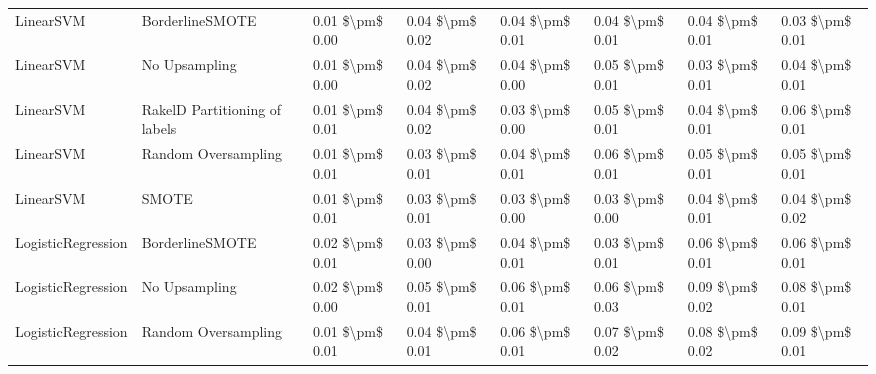 \begin{tabular}{llllllll}
                      LinearSVM &               BorderlineSMOTE & 0.01 \$\textbackslash pm\$ 0.00 &           0.04 \$\textbackslash pm\$ 0.02 &       0.04 \$\textbackslash pm\$ 0.01 &        0.04 \$\textbackslash pm\$ 0.01 &                         0.04 \$\textbackslash pm\$ 0.01 &     0.03 \$\textbackslash pm\$ 0.01 \\
                      LinearSVM &                 No Upsampling & 0.01 \$\textbackslash pm\$ 0.00 &           0.04 \$\textbackslash pm\$ 0.02 &       0.04 \$\textbackslash pm\$ 0.00 &        0.05 \$\textbackslash pm\$ 0.01 &                         0.03 \$\textbackslash pm\$ 0.01 &     0.04 \$\textbackslash pm\$ 0.01 \\
                      LinearSVM & RakelD Partitioning of labels & 0.01 \$\textbackslash pm\$ 0.01 &           0.04 \$\textbackslash pm\$ 0.02 &       0.03 \$\textbackslash pm\$ 0.00 &        0.05 \$\textbackslash pm\$ 0.01 &                         0.04 \$\textbackslash pm\$ 0.01 &     0.06 \$\textbackslash pm\$ 0.01 \\
                      LinearSVM &           Random Oversampling & 0.01 \$\textbackslash pm\$ 0.01 &           0.03 \$\textbackslash pm\$ 0.01 &       0.04 \$\textbackslash pm\$ 0.01 &        0.06 \$\textbackslash pm\$ 0.01 &                         0.05 \$\textbackslash pm\$ 0.01 &     0.05 \$\textbackslash pm\$ 0.01 \\
                      LinearSVM &                         SMOTE & 0.01 \$\textbackslash pm\$ 0.01 &           0.03 \$\textbackslash pm\$ 0.01 &       0.03 \$\textbackslash pm\$ 0.00 &        0.03 \$\textbackslash pm\$ 0.00 &                         0.04 \$\textbackslash pm\$ 0.01 &     0.04 \$\textbackslash pm\$ 0.02 \\
             LogisticRegression &               BorderlineSMOTE & 0.02 \$\textbackslash pm\$ 0.01 &           0.03 \$\textbackslash pm\$ 0.00 &       0.04 \$\textbackslash pm\$ 0.01 &        0.03 \$\textbackslash pm\$ 0.01 &                         0.06 \$\textbackslash pm\$ 0.01 &     0.06 \$\textbackslash pm\$ 0.01 \\
             LogisticRegression &                 No Upsampling & 0.02 \$\textbackslash pm\$ 0.00 &           0.05 \$\textbackslash pm\$ 0.01 &       0.06 \$\textbackslash pm\$ 0.01 &        0.06 \$\textbackslash pm\$ 0.03 &                         0.09 \$\textbackslash pm\$ 0.02 &     0.08 \$\textbackslash pm\$ 0.01 \\
             LogisticRegression &           Random Oversampling & 0.01 \$\textbackslash pm\$ 0.01 &           0.04 \$\textbackslash pm\$ 0.01 &       0.06 \$\textbackslash pm\$ 0.01 &        0.07 \$\textbackslash pm\$ 0.02 &                         0.08 \$\textbackslash pm\$ 0.02 &     0.09 \$\textbackslash pm\$ 0.01 \\

\end{tabular}
